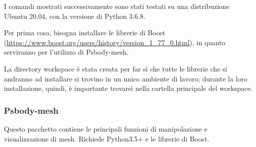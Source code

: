 \medskip

I comandi mostrati successivamente sono stati testati su una distribuzione Ubuntu 20.04, con la versione di Python 3.6.8.

\medskip

Per prima cosa, bisogna installare le librerie di Boost (\url{https://www.boost.org/users/history/version_1_77_0.html}), in quanto serviranno per l’utilizzo di Psbody-mesh.

\medskip








\medskip

La directory workspace è stata creata per far sì che tutte le librerie che si andranno ad installare si trovino in un unico ambiente di lavoro; durante la loro installazione, quindi, è importante trovarsi nella cartella principale del workspace.


\medskip

\subsubsection{Psbody-mesh}

Questo pacchetto contiene le principali funzioni di manipolazione e visualizzazione di mesh. Richiede Python3.5$+$ e le librerie di Boost.

\medskip







